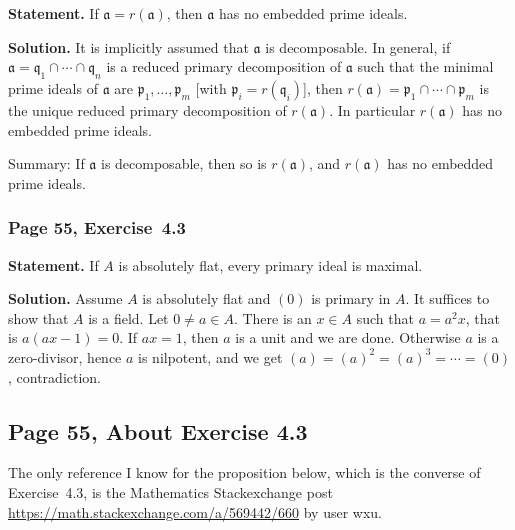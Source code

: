 \documentclass[12pt,letterpaper]{article}%
\newcommand{\mf}{\mathfrak}
\newcommand{\aaa}{\mf a}
\newcommand{\ppp}{\mf p}
\newcommand{\qqq}{\mf q}
\newcommand{\nn}{\noindent}
\begin{document}
\textbf{Statement.} If $\aaa=r(\aaa)$, then $\aaa$ has no embedded prime ideals.

\nn\textbf{Solution.} It is implicitly assumed that $\aaa$ is decomposable. In general, if $\aaa=\qqq_1\cap\cdots\cap\qqq_n$ is a reduced primary decomposition of $\aaa$ such that the minimal prime ideals of $\aaa$ are $\ppp_1,\dots,\ppp_m$ [with $\ppp_i=r(\qqq_i)$], then $r(\aaa)=\ppp_1\cap\cdots\cap\ppp_m$ is the unique reduced primary decomposition of $r(\aaa)$. In particular $r(\aaa)$ has no embedded prime ideals. 

Summary: If $\aaa$ is decomposable, then so is $r(\aaa)$, and $r(\aaa)$ has no embedded prime ideals.

\subsubsection{Page 55, Exercise~4.3}%

\textbf{Statement.} If $A$ is absolutely flat, every primary ideal is maximal.

\nn\textbf{Solution.} Assume $A$ is absolutely flat and $(0)$ is primary in $A$. It suffices to show that $A$ is a field. Let $0\ne a\in A$. There is an $x\in A$ such that $a=a^2x$, that is $a(ax-1)=0$. If $ax=1$, then $a$ is a unit and we are done. Otherwise $a$ is a zero-divisor, hence $a$ is nilpotent, and we get $(a)=(a)^2=(a)^3=\cdots=(0)$, contradiction.

\subsection{Page 55, About Exercise 4.3}%

The only reference I know for the proposition below, which is the converse of Exercise~4.3, is the Mathematics Stackexchange post \href{https://math.stackexchange.com/a/569442/660}{https://math.stackexchange.com/a/569442/660} by user wxu.
\end{document}
